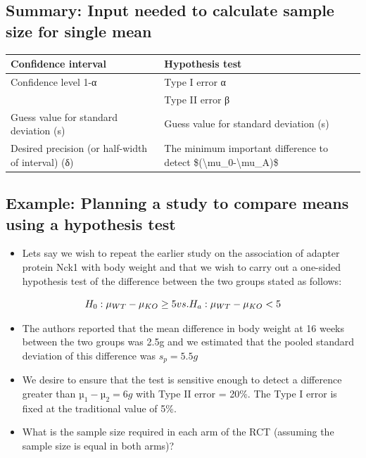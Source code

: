 \documentclass[
]{book}
\providecommand{\tightlist}{%
  \setlength{\itemsep}{0pt}\setlength{\parskip}{0pt}}
\begin{document}
\hypertarget{summary-input-needed-to-calculate-sample-size-for-single-mean}{%
\subsection{Summary: Input needed to calculate sample size for single mean}\label{summary-input-needed-to-calculate-sample-size-for-single-mean}}

\begin{tabular}{l|l}
\hline
Confidence interval & Hypothesis test\\
\hline
Confidence level 1-α & Type I error α\\
\hline
 & Type II error β\\
\hline
Guess value for standard deviation (s) & Guess value for standard deviation (s)\\
\hline
Desired precision (or half-width of interval) (δ) & The minimum important difference to detect \$(\textbackslash{}mu\_0-\textbackslash{}mu\_A)\$\\
\hline
\end{tabular}

\hypertarget{example-planning-a-study-to-compare-means-using-a-hypothesis-test}{%
\subsection{Example: Planning a study to compare means using a hypothesis test}\label{example-planning-a-study-to-compare-means-using-a-hypothesis-test}}

\begin{itemize}
\tightlist
\item
  Lets say we wish to repeat the earlier study on the association of adapter protein Nck1 with body weight and that we wish to carry out a one-sided hypothesis test of the difference between the two groups stated as follows:
\end{itemize}

\[H_0:\mu_{WT}-\mu_{KO}\geq 5\space vs. \space H_a:\mu_{WT}-\mu_{KO}<5\]

\begin{itemize}
\tightlist
\item
  The authors reported that the mean difference in body weight at 16 weeks between the two groups was 2.5g and we estimated that the pooled standard deviation of this difference was \(s_p=5.5g\)
\item
  We desire to ensure that the test is sensitive enough to detect a difference greater than \(µ_1 - µ_2 = 6g\) with Type II error = 20\%. The Type I error is fixed at the traditional value of 5\%.
\item
  What is the sample size required in each arm of the RCT (assuming the sample size is equal in both arms)?
\end{itemize}
\end{document}
